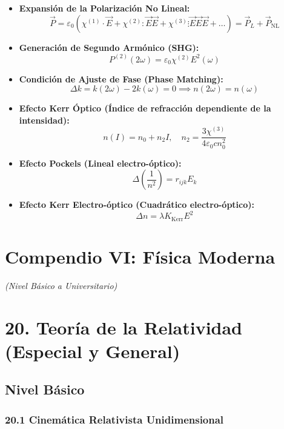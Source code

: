 \documentclass[11pt,a4paper]{article}
\begin{document}
\begin{itemize}
  \item \textbf{Expansión de la Polarización No Lineal:}
  \[
    \vec{P} = \varepsilon_0 \left( \chi^{(1)} \cdot \vec{E} + \chi^{(2)} : \vec{E} \vec{E} + \chi^{(3)} \vdots \vec{E} \vec{E} \vec{E} + \dots \right) = \vec{P}_L + \vec{P}_{\text{NL}}
  \]
  \item \textbf{Generación de Segundo Armónico (SHG):}
  \[
    P^{(2)}(2\omega) = \varepsilon_0 \chi^{(2)} E^2(\omega)
  \]
  \item \textbf{Condición de Ajuste de Fase (Phase Matching):}
  \[
    \Delta k = k(2\omega) - 2k(\omega) = 0 \implies n(2\omega) = n(\omega)
  \]
  \item \textbf{Efecto Kerr Óptico (Índice de refracción dependiente de la intensidad):}
  \[
    n(I) = n_0 + n_2 I, \quad n_2 = \frac{3 \chi^{(3)}}{4 \varepsilon_0 c n_0^2}
  \]
  \item \textbf{Efecto Pockels (Lineal electro-óptico):}
  \[
    \Delta\left(\frac{1}{n^2}\right) = r_{ijk} E_k
  \]
  \item \textbf{Efecto Kerr Electro-óptico (Cuadrático electro-óptico):}
  \[
    \Delta n = \lambda K_{\text{Kerr}} E^2
  \]
\end{itemize}

\section*{Compendio VI: Física Moderna}

\textit{(Nivel Básico a Universitario)}

\section*{20. Teoría de la Relatividad (Especial y General)}

\subsection*{Nivel Básico}

\subsubsection*{20.1 Cinemática Relativista Unidimensional}
\end{document}
